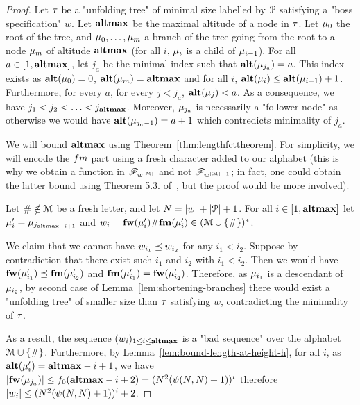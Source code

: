 \begin{proof}
	Let $\tau$ be a "unfolding tree" of minimal size labelled by $\mathcal{P}$ satisfying a "boss specification" $w$. Let $\mathbf{altmax}$ be the maximal altitude of a node in $\tau$. Let $\mu_0$ the root of the tree, and  $\mu_0, \ldots, \mu_m$ a branch of the tree going from the root to a node $\mu_m$ of altitude $\mathbf{altmax}$ (for all $i$, $\mu_i$ is a child of $\mu_{i-1}$).
	For all $a \in [1,\mathbf{altmax}]$, let $j_a$ be the minimal index such that $\mathbf{alt}(\mu_{j_a}) = a$. This index exists as $\mathbf{alt}(\mu_0) = 0$, $\mathbf{alt}(\mu_m) = \mathbf{altmax}$ and for all $i$, $\mathbf{alt}(\mu_{i}) \leq \mathbf{alt}(\mu_{i-1})+1$.
	Furthermore, for every $a$, for every $j < j_a$, $\mathbf{alt}(\mu_j) < a$. 
	As a consequence, we have $j_1 < j_2 < \ldots < j_{\mathbf{altmax}}$. Moreover, $\mu_{j_a}$ is necessarily a "follower node" as otherwise we would have $\mathbf{alt}(\mu_{j_a-1}) = a+1$ which contredicts minimality of $j_a$.
	
	We will bound $\mathbf{altmax}$ using Theorem~\ref{thm:lengthfcttheorem}. For simplicity, we will encode the $\followmessagespec$ part using a fresh character added to our alphabet (this is why we obtain a function in $\mathscr{F}_{w^{|\mathcal{M}|}}$ and not $\mathscr{F}_{w^{|\mathcal{M}|-1}}$; in fact, one could obtain the latter bound using Theorem 5.3. of~\cite{SchmitzS2011upperHigman}, but the proof would be more involved).

	Let $\# \notin \mathcal{M}$ be a fresh letter, and let $N = |w| + |\mathcal{P}|+1$. For all $i \in [1,\mathbf{altmax}]$ let $\mu'_i = \mu_{j_{\mathbf{altmax} - i+1}}$ and $w_i = \mathbf{fw}(\mu'_{i}) \# \mathbf{fm}(\mu'_{i}) \in (\mathcal{M} \cup \{\#\})^*$.
	
	We claim that we cannot have $w_{i_1}\preceq w_{i_2}$ for any  $i_1< i_2$.
	Suppose by contradiction that there exist such $i_1$ and $i_2$ with $i_1 < i_2$. Then we would have $\mathbf{fw}(\mu'_{i_1}) \preceq \mathbf{fm}(\mu'_{i_2})$ and $\mathbf{fm}(\mu'_{i_1}) = \mathbf{fw}(\mu'_{i_2})$.
	Therefore, as $\mu_{i_1}$ is a descendant of $\mu_{i_2}$, by second case of Lemma~\ref{lem:shortening-branches} there would exist a "unfolding tree" of smaller size than $\tau$ satisfying $w$, contradicting the minimality of $\tau$.
	
	As a result, the sequence $(w_i)_{1\leq i \leq \mathbf{altmax}}$ is a "bad sequence" over the alphabet $\mathcal{M}\cup\{\#\}$.
	Furthermore, by Lemma~\ref{lem:bound-length-at-height-h}, for all $i$, as $\mathbf{alt}(\mu'_{i}) = \mathbf{altmax}-i+1$, we have $|\mathbf{fw}(\mu_{j_a})| \leq f_0(\mathbf{altmax}-i+2) = (N^2(\psi(N,N)+1))^{i}$ therefore $|w_i| \leq (N^2(\psi(N,N)+1))^{i}+2$.
	

\end{proof}
